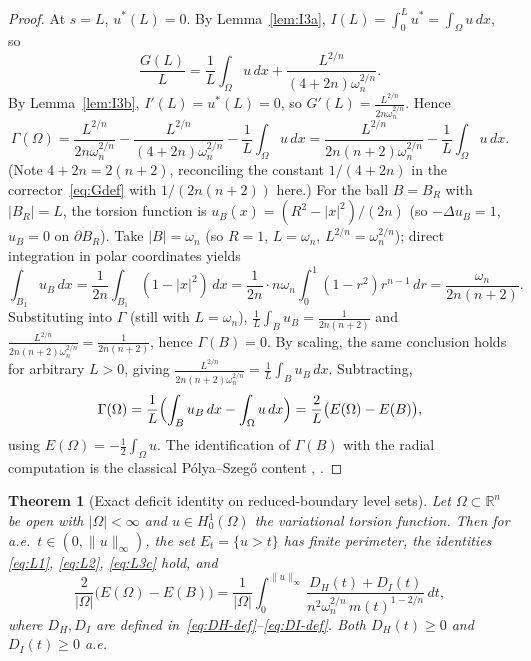 \documentclass[11pt]{article}
\newtheorem{theorem}{Theorem}[section]
\theoremstyle{definition}
\newcommand{\R}{\mathbb{R}}
\newcommand{\Om}{\Omega}
\begin{document}
\begin{proof}
At $s=L$, $u^{*}(L)=0$. By Lemma~\ref{lem:I3a},
$I(L)=\int_{0}^{L}u^{*}=\int_{\Om}u\,dx$, so
\[
   \frac{G(L)}{L}=\frac{1}{L}\int_{\Om}u\,dx
                  +\frac{L^{2/n}}{(4+2n)\omega_{n}^{2/n}}.
\]
By Lemma~\ref{lem:I3b}, $I'(L)=u^{*}(L)=0$, so $G'(L)=
\frac{L^{2/n}}{2n\omega_{n}^{2/n}}$. Hence
\[
   \Gamma(\Om)
   =\frac{L^{2/n}}{2n\omega_{n}^{2/n}}
    -\frac{L^{2/n}}{(4+2n)\omega_{n}^{2/n}}
    -\frac{1}{L}\int_{\Om}u\,dx
   =\frac{L^{2/n}}{2n(n+2)\omega_{n}^{2/n}}-\frac{1}{L}\int_{\Om}u\,dx.
\]
(Note $4+2n=2(n+2)$, reconciling the constant $1/(4+2n)$ in the
corrector~\eqref{eq:Gdef} with $1/(2n(n+2))$ here.)
For the ball $B=B_{R}$ with $|B_{R}|=L$, the torsion function is
$u_{B}(x)=(R^{2}-|x|^{2})/(2n)$ (so $-\Delta u_{B}=1$, $u_{B}=0$ on
$\partial B_{R}$). Take $|B|=\omega_{n}$ (so $R=1$, $L=\omega_{n}$,
$L^{2/n}=\omega_{n}^{2/n}$); direct integration in polar coordinates
yields
\[
   \int_{B_{1}}u_{B}\,dx
   =\frac{1}{2n}\int_{B_{1}}(1-|x|^{2})\,dx
   =\frac{1}{2n}\cdot n\omega_{n}\int_{0}^{1}(1-r^{2})r^{n-1}\,dr
   =\frac{\omega_{n}}{2n(n+2)}.
\]
Substituting into $\Gamma$ (still with $L=\omega_{n}$),
$\frac{1}{L}\int_{B}u_{B}=\frac{1}{2n(n+2)}$ and
$\frac{L^{2/n}}{2n(n+2)\omega_{n}^{2/n}}=\frac{1}{2n(n+2)}$, hence
$\Gamma(B)=0$. By scaling, the same conclusion holds for arbitrary
$L>0$, giving
$\frac{L^{2/n}}{2n(n+2)\omega_{n}^{2/n}}=\frac{1}{L}\int_{B}u_{B}\,dx$.
Subtracting,
\[
   \Gamma(\Om)
   =\frac{1}{L}\Bigl(\int_{B}u_{B}\,dx-\int_{\Om}u\,dx\Bigr)
   =\frac{2}{L}\bigl(E(\Om)-E(B)\bigr),
\]
using $E(\Om)=-\tfrac12\int_{\Om}u$. The identification of $\Gamma(B)$
with the radial computation is the classical P\'olya--Szeg\H{o} content
\cite{PolyaSzego1951}, \cite[\S II.5]{Bandle1980}.
\end{proof}

\begin{theorem}[Exact deficit identity on reduced-boundary level sets]
\label{thm:main}
Let $\Om\subset\R^{n}$ be open with $|\Om|<\infty$ and $u\in H^{1}_{0}(\Om)$
the variational torsion function. Then for a.e.\ $t\in(0,\|u\|_{\infty})$,
the set $E_{t}=\{u>t\}$ has finite perimeter, the identities
\eqref{eq:L1}, \eqref{eq:L2}, \eqref{eq:L3c} hold, and
\begin{equation}\label{eq:main}
   \boxed{\;
   \frac{2}{|\Om|}\bigl(E(\Om)-E(B)\bigr)
   =\frac{1}{|\Om|}\int_{0}^{\|u\|_{\infty}}
     \frac{D_{H}(t)+D_{I}(t)}{n^{2}\omega_{n}^{2/n}\,m(t)^{1-2/n}}\,dt,\;}
\end{equation}
where $D_{H},D_{I}$ are defined in~\eqref{eq:DH-def}--\eqref{eq:DI-def}.
Both $D_{H}(t)\ge 0$ and $D_{I}(t)\ge 0$ a.e.
\end{theorem}
\end{document}
